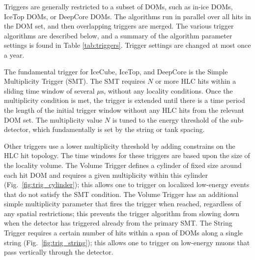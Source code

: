 Triggers are generally restricted to a subset of DOMs, such as in-ice DOMs,
IceTop DOMs, or DeepCore DOMs.  The algorithms run in parallel over all
hits in the DOM set, and then overlapping triggers are merged.  The various
trigger algorithms are described below, and a summary of the algorithm
parameter settings is found in Table \ref{tab:triggers}.  Trigger settings
are changed at most once a year.

The fundamental trigger for IceCube, IceTop, and DeepCore is the Simple
Multiplicity Trigger (SMT).  The SMT requires $N$ or more HLC hits within a
sliding time window of several $\mu\mathrm{s}$, without any locality
conditions.  Once the multiplicity condition is met, the trigger is 
extended until there is a time period the length of the initial trigger
window without any HLC hits from the relevant DOM set.  The
multiplicity value $N$ is tuned to the energy threshold of the sub-detector,
which fundamentally is set by the string or tank spacing.

Other triggers use a lower multiplicity threshold by adding constrains on
the HLC hit topology.  The time windows for these triggers are based upon
the size of the locality volume. The Volume Trigger defines a cylinder of fixed size around
each hit DOM and requires a given multiplicity within this cylinder
(Fig.~\ref{fig:trig_cylinder}); this allows one to trigger on localized
low-energy events that do not satisfy the SMT condition.  The Volume Trigger
has an additional simple multiplicity parameter that fires the trigger when
reached, regardless of any spatial restrictions; this prevents the trigger
algorithm from slowing down when the detector has triggered already from
the primary SMT. The String Trigger requires a certain number of hits
within a span of DOMs along a single string 
(Fig.~\ref{fig:trig_string}); this allows one to trigger on low-energy
muons that pass vertically through the detector.

